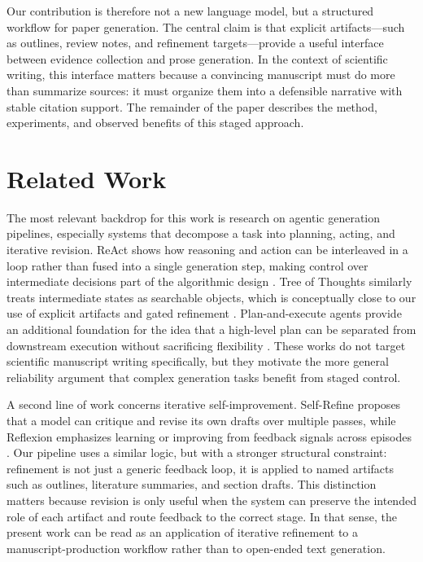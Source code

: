 \documentclass{article}
\begin{document}
Our contribution is therefore not a new language model, but a structured workflow for paper generation. The central claim is that explicit artifacts---such as outlines, review notes, and refinement targets---provide a useful interface between evidence collection and prose generation. In the context of scientific writing, this interface matters because a convincing manuscript must do more than summarize sources: it must organize them into a defensible narrative with stable citation support. The remainder of the paper describes the method, experiments, and observed benefits of this staged approach.

\section{Related Work}

The most relevant backdrop for this work is research on agentic generation pipelines, especially systems that decompose a task into planning, acting, and iterative revision. ReAct shows how reasoning and action can be interleaved in a loop rather than fused into a single generation step, making control over intermediate decisions part of the algorithmic design \cite{author2024ReactSynergizingReasoning}. Tree of Thoughts similarly treats intermediate states as searchable objects, which is conceptually close to our use of explicit artifacts and gated refinement \cite{author2024TreeOfThoughts}. Plan-and-execute agents provide an additional foundation for the idea that a high-level plan can be separated from downstream execution without sacrificing flexibility \cite{author2024PlanAndExecute}. These works do not target scientific manuscript writing specifically, but they motivate the more general reliability argument that complex generation tasks benefit from staged control.

A second line of work concerns iterative self-improvement. Self-Refine proposes that a model can critique and revise its own drafts over multiple passes, while Reflexion emphasizes learning or improving from feedback signals across episodes \cite{author2024SelfRefine,author2024Reflexion}. Our pipeline uses a similar logic, but with a stronger structural constraint: refinement is not just a generic feedback loop, it is applied to named artifacts such as outlines, literature summaries, and section drafts. This distinction matters because revision is only useful when the system can preserve the intended role of each artifact and route feedback to the correct stage. In that sense, the present work can be read as an application of iterative refinement to a manuscript-production workflow rather than to open-ended text generation.
\end{document}
